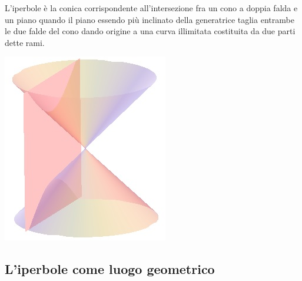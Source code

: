 \noindent\begin{minipage}{.75\textwidth}
L'iperbole è la conica corrispondente all'intersezione fra un cono a doppia 
falda e un piano quando il piano essendo più inclinato della generatrice 
taglia entrambe le due falde del cono dando origine a una curva illimitata 
costituita da due parti dette rami.
\end{minipage}
\hspace{.5cm}
\begin{minipage}{.2\textwidth}
  \includegraphics[width=\textwidth]{img/iperbole2.jpg}
\end{minipage}  

\subsection{L'iperbole come luogo geometrico}
\label{subsec:iperbole_luogogeometrico}

